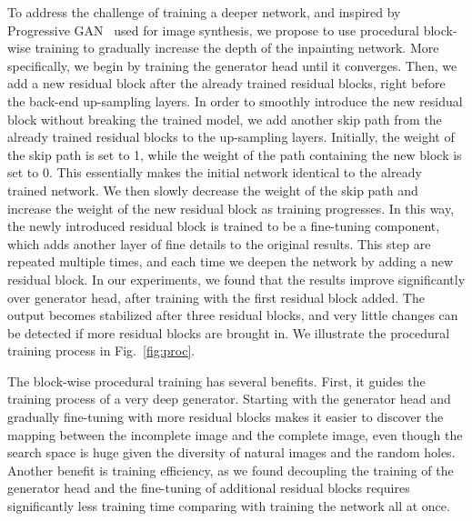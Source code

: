 To address the challenge of training a deeper network, and inspired by Progressive GAN~\cite{karras2017progressive} used for image synthesis, we propose to use procedural block-wise training to gradually increase the depth of the inpainting network. More specifically, we begin by training the generator head until it converges. Then, we add a new residual block after the already trained residual blocks, right before the back-end up-sampling layers. In order to smoothly introduce the new residual block without breaking the trained model, we add another skip path from the already trained residual blocks to the up-sampling layers. Initially, the weight of the skip path is set to 1, while the weight of the path containing the new block is set to 0. This essentially makes the initial network identical to the already trained network. We then slowly decrease the weight of the skip path and increase the weight of the new residual block as training progresses. In this way, the newly introduced residual block is trained to be a fine-tuning component, which adds another layer of fine details to the original results. This step are repeated multiple times, and each time we deepen the network by adding a new residual block. In our experiments, we found that the results improve significantly over generator head, after training with the first residual block added. The output becomes stabilized after three residual blocks, and very little changes can be detected if more residual blocks are brought in. We illustrate the procedural training process in Fig.~\ref{fig:proc}.

The block-wise procedural training has several benefits. First, it guides the training process of a very deep generator. Starting with the generator head and gradually fine-tuning with more residual blocks makes it easier to discover the mapping between the incomplete image and the complete image, even though the search space is huge given the diversity of natural images and the random holes. Another benefit is training efficiency, as we found decoupling the training of the generator head and the fine-tuning of additional residual blocks requires significantly less training time comparing with training the network all at once.

